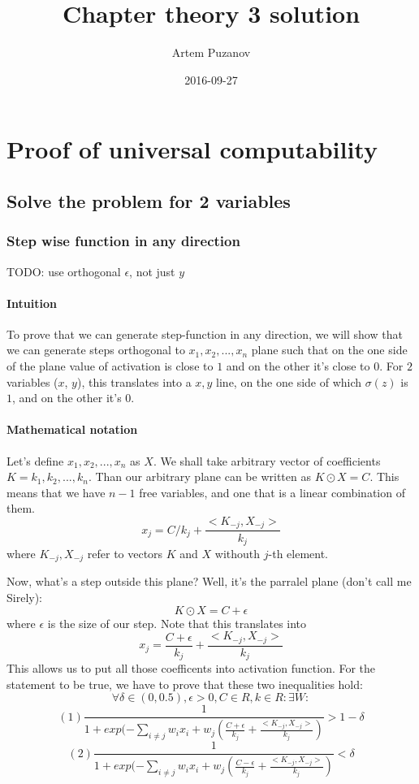 \documentclass{article}
\title{Chapter theory 3 solution}
\date{2016-09-27}
\author{Artem Puzanov}
\begin{document}
\maketitle
{}
\newpage
{}


\section{Proof of universal computability}
\subsection{Solve the problem for 2 variables}

\subsubsection{Step wise function in any direction}

TODO: use orthogonal $\epsilon$, not just $y$

\paragraph{Intuition}
To prove that we can generate step-function in any direction, we will show that we can
generate steps orthogonal to ${x_1, x_2, ..., x_n}$ plane such that on the one side of the plane value of activation is close to $1$
and on the other it's close to $0$. For $2$ variables ($x$, $y$), this translates into a ${x, y}$ line, on the one side of which $\sigma(z)$
is $1$, and on the other it's $0$.
\paragraph{Mathematical notation}
Let's define ${x_1, x_2, ..., x_n}$ as $X$. We shall take arbitrary vector of coefficients $K = {k_1, k_2, ..., k_n}$.
Than our arbitrary plane can be written as $K \odot X = C$. This means that we have $n-1$ free variables, and one that is a linear combination of them.
$$x_j = C/k_j + \frac{<K_{-j} , X_{-j}>}{k_j}$$
where $K_{-j} , X_{-j}$ refer to vectors $K$ and $X$ withouth $j$-th element.

Now, what's a step outside this plane?
Well, it's the parralel plane (don't call me Sirely):
$$K \odot X = C + \epsilon$$
where $\epsilon$ is the size of our step.
Note that this translates into
$$x_j = \frac{C + \epsilon}{k_j} + \frac{<K_{-j} , X_{-j}>}{k_j}$$
This allows us to put all those coefficents into activation function.
For the statement to be true, we have to prove that these two inequalities hold:
$$\forall \delta \in (0, 0.5), \epsilon > 0 , C \in R,  k \in R: \exists W:$$
$$(1) \frac{1}{1 + exp(- \sum_{i \neq j}w_ix_i + w_j (\frac{C + \epsilon}{k_j} + \frac{<K_{-j} , X_{-j}>}{k_j})} > 1-\delta$$
$$(2) \frac{1}{1 + exp(- \sum_{i \neq j}w_ix_i + w_j (\frac{C - \epsilon}{k_j} + \frac{<K_{-j} , X_{-j}>}{k_j})} < \delta$$
\end{document}
